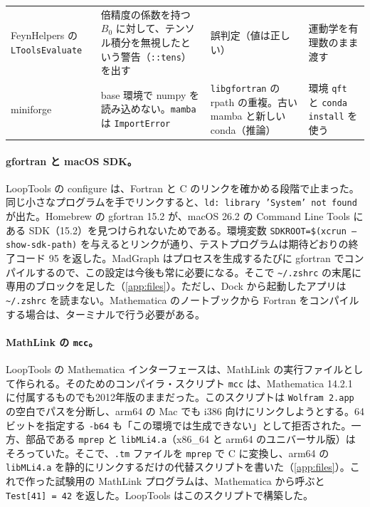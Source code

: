 \documentclass[a4paper,10pt]{ltjsarticle}
\newcommand{\pth}[1]{\texttt{\textasciitilde/}\nolinkurl{#1}}
\begin{document}
\begin{table}[p]
\begin{tabularx}{\linewidth}{>{\raggedright\arraybackslash}p{2.4cm}>{\raggedright\arraybackslash}X>{\raggedright\arraybackslash}X>{\raggedright\arraybackslash}X}
FeynHelpers の \texttt{LToolsEvaluate} & 倍精度の係数を持つ $B_0$ に対して、テンソル積分を無視したという警告（\texttt{::tens}）を出す & 誤判定（値は正しい） & 運動学を有理数のまま渡す \\
miniforge & base 環境で numpy を読み込めない。\texttt{mamba} は \texttt{ImportError} & \texttt{libgfortran} の rpath の重複。古い mamba と新しい conda（推論） & 環境 \texttt{qft} と \texttt{conda install} を使う \\
\bottomrule
\end{tabularx}
\end{table}

\paragraph{gfortran と macOS SDK。}LoopTools の configure は、Fortran と C のリンクを確かめる段階で止まった。同じ小さなプログラムを手でリンクすると、\texttt{ld: library 'System' not found} が出た。Homebrew の gfortran 15.2 が、macOS 26.2 の Command Line Tools にある SDK（15.2）を見つけられないためである。環境変数 \texttt{SDKROOT=\$(xcrun --show-sdk-path)} を与えるとリンクが通り、テストプログラムは期待どおりの終了コード 95 を返した。MadGraph はプロセスを生成するたびに gfortran でコンパイルするので、この設定は今後も常に必要になる。そこで \pth{.zshrc} の末尾に専用のブロックを足した（\ref{app:files}）。ただし、Dock から起動したアプリは \pth{.zshrc} を読まない。Mathematica のノートブックから Fortran をコンパイルする場合は、ターミナルで行う必要がある。

\paragraph{MathLink の \texttt{mcc}。}LoopTools の Mathematica インターフェースは、MathLink の実行ファイルとして作られる。そのためのコンパイラ・スクリプト \texttt{mcc} は、Mathematica 14.2.1 に付属するものでも2012年版のままだった。このスクリプトは \texttt{Wolfram 2.app} の空白でパスを分断し、arm64 の Mac でも i386 向けにリンクしようとする。64ビットを指定する \texttt{-b64} も「この環境では生成できない」として拒否された。一方、部品である \texttt{mprep} と \texttt{libMLi4.a}（x86\_64 と arm64 のユニバーサル版）はそろっていた。そこで、\texttt{.tm} ファイルを \texttt{mprep} で C に変換し、arm64 の \texttt{libMLi4.a} を静的にリンクするだけの代替スクリプトを書いた（\ref{app:files}）。これで作った試験用の MathLink プログラムは、Mathematica から呼ぶと \texttt{Test[41] = 42} を返した。LoopTools はこのスクリプトで構築した。
\end{document}
